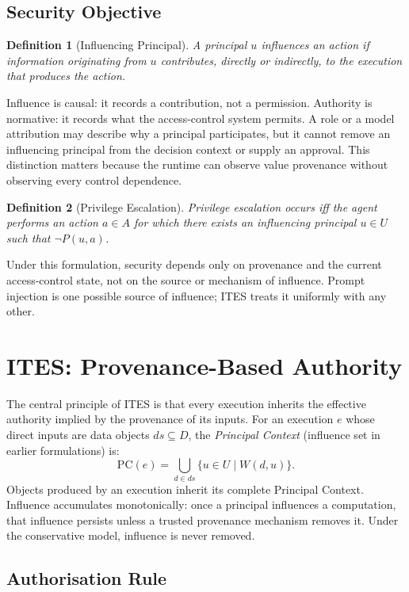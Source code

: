 \documentclass[11pt]{article}
\newtheorem{definition}{Definition}
\begin{document}
\subsection{Security Objective}

\begin{definition}[Influencing Principal]
A principal $u$ influences an action if information originating from $u$
contributes, directly or indirectly, to the execution that produces the
action.
\end{definition}

Influence is causal: it records a contribution, not a permission. Authority
is normative: it records what the access-control system permits. A role or a
model attribution may describe why a principal participates, but it cannot
remove an influencing principal from the decision context or supply an
approval. This distinction matters because the runtime can observe value
provenance without observing every control dependence.

\begin{definition}[Privilege Escalation]
Privilege escalation occurs iff the agent performs an action $a \in A$ for
which there exists an influencing principal $u \in U$ such that $\neg
P(u, a)$.
\end{definition}

Under this formulation, security depends only on provenance and the current
access-control state, not on the source or mechanism of influence. Prompt
injection is one possible source of influence; ITES treats it uniformly with
any other.


\section{ITES: Provenance-Based Authority}
\label{sec:ites}

The central principle of ITES is that every execution inherits the
effective authority implied by the provenance of its inputs. For an
execution $e$ whose direct inputs are data objects $ds \subseteq D$, the
\emph{Principal Context} (influence set in earlier formulations) is:
\[
\mathrm{PC}(e) = \bigcup_{d \in ds} \{u \in U \mid W(d, u)\}.
\]
Objects produced by an execution inherit its complete Principal Context.
Influence accumulates monotonically: once a principal influences a
computation, that influence persists unless a trusted provenance mechanism
removes it. Under the conservative model, influence is never removed.

\subsection{Authorisation Rule}
\end{document}
